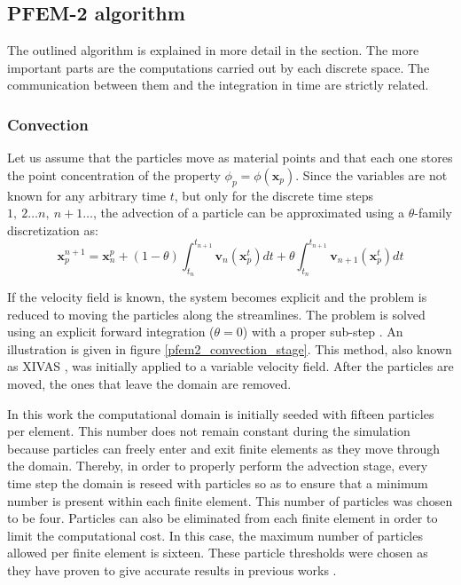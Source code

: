 \subsection{PFEM-2 algorithm}


The outlined algorithm is explained in more detail in the section. The more important parts are the computations carried out by each discrete space. The communication between them and the integration in time are strictly related.


\subsubsection{Convection}


Let us assume that the particles move as material points and that each one stores the point concentration of the property $\phi_p = \phi(\mathbf x_p)$. Since the variables are not known for any arbitrary time $t$, but only for the discrete time steps $1,\ 2\dots n,\ n+1\dots$, the advection of a particle can be approximated using a $\theta$-family discretization as:
\begin{equation}
\mathbf{x}_p^{n+1} = \mathbf{x}_n^p + (1-\theta) \int_{t_n}^{t_{n+1}} \mathbf{v}_n(\mathbf{x}_p^t)dt + \theta \int_{t_n}^{t_{n+1}} \mathbf{v}_{n+1}(\mathbf{x}_p^t)dt
\end{equation}

If the velocity field is known, the system becomes explicit and the problem is reduced to moving the particles along the streamlines. The problem is solved using an explicit forward integration ($\theta=0$) with a proper sub-step \cite{idelsohn2012}. An illustration is given in figure \ref{pfem2_convection_stage}. This method, also known as XIVAS \cite{idelsohn2013}\cite{idelsohn2014}, was initially applied to a variable velocity field.
After the particles are moved, the ones that leave the domain are removed.

In this work the computational domain is initially seeded with fifteen particles per element. This number does not remain constant during the simulation because particles can freely enter and exit finite elements as they move through the domain. Thereby, in order to properly perform the advection stage, every time step the domain is reseed with particles so as to ensure that a minimum number is present within each finite element. This number of particles was chosen to be four. Particles can also be eliminated from each finite element in order to limit the computational cost. In this case, the maximum number of particles allowed per finite element is sixteen. These particle thresholds were chosen as they have proven to give accurate results in previous works \cite{idelsohn2015}.

